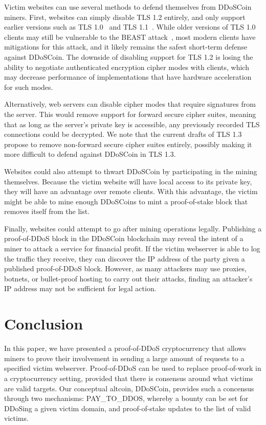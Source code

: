 Victim websites can use several methods to defend themselves from
DDoSCoin miners. First, websites can simply disable TLS 1.2 entirely, and only
support earlier versions such as TLS 1.0~\cite{rfc2246} and TLS
1.1~\cite{rfc4346}. While older versions of
TLS 1.0 clients may still be vulnerable to the BEAST attack~\cite{beast}, most
modern clients have mitigations for this attack, and it likely remains the
safest short-term defense against DDoSCoin. The downside of disabling support
for TLS 1.2 is losing the ability to negotiate authenticated encryption cipher
modes with clients, which may decrease performance of implementations that have
hardware acceleration for such modes.

Alternatively, web servers can disable cipher modes that require signatures from
the server. This would remove support for forward secure cipher suites, meaning
that as long as the server's private key is accessible, any previously recorded
TLS connections could be decrypted. We note that the current drafts of TLS 1.3
propose to remove non-forward secure cipher suites entirely, possibly making it
more difficult to defend against DDoSCoin in TLS 1.3.

Websites could also attempt to thwart DDoSCoin by participating in the mining
themselves. Because the victim website will have local access to its private
key, they will have an advantage over remote clients. With this advantage, the
victim might be able to mine enough DDoSCoins to mint a proof-of-stake block
that removes itself from the list.

Finally, websites could attempt to go after mining operations legally.
Publishing a proof-of-DDoS block in the DDoSCoin blockchain may reveal the
intent of a miner to attack a service for financial profit. If the victim webserver is able to
log the traffic they receive, they can discover the IP address of the party
given a published proof-of-DDoS block. However, as many attackers may use proxies,
botnets, or bullet-proof hosting to carry out their attacks, finding an
attacker's IP address may not be sufficient for legal action.


\section{Conclusion}

In this paper, we have presented a proof-of-DDoS cryptocurrency that allows
miners to prove their involvement in sending a large amount of requests to a
specified victim webserver. Proof-of-DDoS can be used to replace proof-of-work
in a cryptocurrency setting, provided that there is consensus around what
victims are valid targets. Our conceptual altcoin, DDoSCoin, provides such a
concensus through two mechanisms: PAY\_TO\_DDOS, whereby a bounty can be set for
DDoSing a given victim domain, and proof-of-stake updates to the list of valid
victims.

